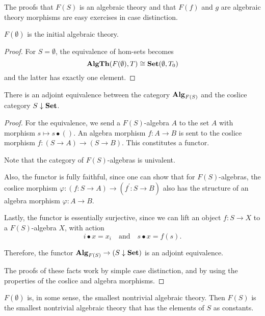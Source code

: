 The proofs that $ F(S) $ is an algebraic theory and that $ F(f) $ and $ g $ are algebraic theory morphisms are easy exercises in case distinction.

\begin{corollary}
  $ F(\emptyset) $ is the initial algebraic theory.
\end{corollary}
\begin{proof}
  For $ S = \emptyset $, the equivalence of hom-sets becomes
  \[ \mathbf{AlgTh}(F(\emptyset), T) \cong \mathbf{Set}(\emptyset, T_0) \]
  and the latter has exactly one element.
\end{proof}

\begin{lemma}
  There is an adjoint equivalence between the category $ \mathbf{Alg}_{F(S)} $ and the coslice category $ S \downarrow \mathbf{Set} $.
\end{lemma}
\begin{proof}
  For the equivalence, we send a $ F(S) $-algebra $ A $ to the set $ A $ with morphism $ s \mapsto s \bullet () $. An algebra morphism $ f: A \to B $ is sent to the coslice morphism $ f: (S \to A) \to (S \to B) $. This constitutes a functor.

  Note that the category of $ F(S) $-algebras is univalent.

  Also, the functor is fully faithful, since one can show that for $ F(S) $-algebras, the coslice morphism $ \varphi: (f: S \to A) \to (f^\prime: S \to B) $ also has the structure of an algebra morphism $ \varphi: A \to B $.

  Lastly, the functor is essentially surjective, since we can lift an object $ f: S \to X $ to a $ F(S) $-algebra $ X $, with action
  \[ i \bullet x = x_i \quad \text{and} \quad s \bullet x = f(s). \]

  Therefore, the functor $ \mathbf{Alg}_{F(S)} \to (S \downarrow \mathbf{Set}) $ is an adjoint equivalence.

  The proofs of these facts work by simple case distinction, and by using the properties of the coslice and algebra morphisms.
\end{proof}

\begin{remark}
  $ F(\emptyset) $ is, in some sense, the smallest nontrivial algebraic theory. Then $ F(S) $ is the smallest nontrivial algebraic theory that has the elements of $ S $ as constants.
\end{remark}


